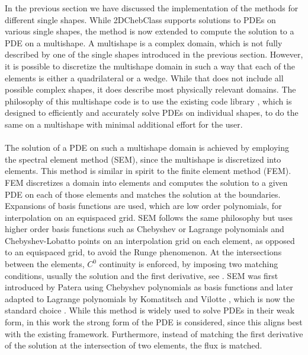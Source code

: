 

In the previous section we have discussed the implementation of the methods for different single shapes. While 2DChebClass supports solutions to PDEs on various single shapes, the method is now extended to compute the solution to a PDE on a multishape. A multishape is a complex domain, which is not fully described by one of the single shapes introduced in the previous section. However, it is possible to discretize the multishape domain in such a way that each of the elements is either a quadrilateral or a wedge. While that does not include all possible complex shapes, it does describe most physically relevant domains. The philosophy of this multishape code is to use the existing code library \cite{GoddardPseudospectralCode1}, which is designed to efficiently and accurately solve PDEs on individual shapes, to do the same on a multishape with minimal additional effort for the user.
\\
\\
The solution of a PDE on such a multishape domain is achieved by employing the spectral element method (SEM), since the multishape is discretized into elements. This method is similar in spirit to the finite element method (FEM). FEM discretizes a domain into elements and computes the solution to a given PDE on each of those elements and matches the solution at the boundaries. Expansions of basis functions are used, which are low order polynomials, for interpolation on an equispaced grid. SEM follows the same philosophy but uses higher order basis functions such as Chebyshev or Lagrange polynomials and Chebyshev-Lobatto points on an interpolation grid on each element, as opposed to an equispaced grid, to avoid the Runge phenomenon. At the intersections between the elements, $C^0$ continuity is enforced, by imposing two matching conditions, usually the solution and the first derivative, see \cite{Boyd1}. SEM was first introduced by Patera \cite{SEMPatera84} using  Chebyshev polynomials as basis functions and later adapted to Lagrange polynomials by Komatitsch and Vilotte \cite{SEMLagrange98}, which is now the standard choice \cite{Boyd1}.
While this method is widely used to solve PDEs in their weak form, in this work the strong form of the PDE is considered, since this aligns best with the existing framework. Furthermore, instead of matching the first derivative of the solution at the intersection of two elements, the flux is matched. 


